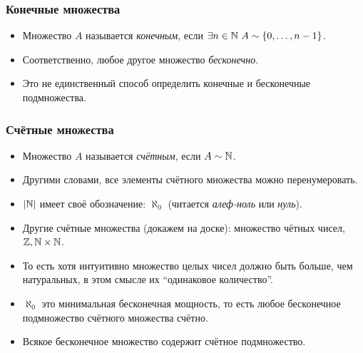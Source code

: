 \documentclass[10pt]{beamer}
\begin{document}
\begin{frame}
    \frametitle{Конечные множества}
    \begin{itemize}
        \item Множество $A$ называется \emph{конечным}, если $\exists n \in \mathbb{N}~A \sim \{0,\dots,n-1\}$.
        \item Соответственно, любое другое множество \emph{бесконечно}.
        \item Это не единственный способ определить конечные и бесконечные подмножества.
    \end{itemize}
\end{frame}

\begin{frame}
    \frametitle{Счётные множества}
    \begin{itemize}
        \item Множество $A$ называется \emph{счётным}, если $A \sim \mathbb{N}$.
        \item Другими словами, все элементы счётного множества можно перенумеровать.
        \item $|\mathbb{N}|$ имеет своё обозначение: $\aleph_0$ (читается \emph{алеф-ноль} или \emph{нуль}).
        \item Другие счётные множества (докажем на доске): множество чётных чисел, $\mathbb{Z}, \mathbb{N} \times \mathbb{N}$.
        \pause
        \item То есть хотя интуитивно множество целых чисел должно быть больше, чем натуральных, в этом смысле их \enquote{одинаковое количество}.
        \pause
        \item $\aleph_0$ это минимальная бесконечная мощность, то есть любое бесконечное подмножество счётного множества счётно.
        \pause
        \item Всякое бесконечное множество содержит счётное подмножество.
    \end{itemize}
\end{frame}
\end{document}
